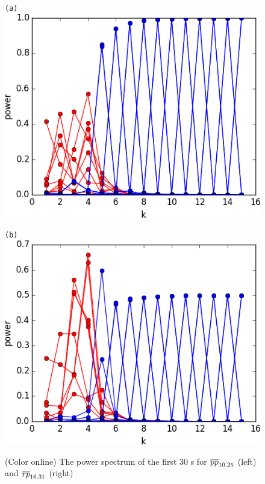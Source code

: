 \documentclass[final,leqno,onefignum,onetabnum]{siamltexmm}
\begin{document}
\begin{figure}[h]
  \centering
  \begin{minipage}{.47\textwidth}
    \centering \small{\texttt{(a)}}
    \includegraphics[width=\textwidth]{ppo1power64}
  \end{minipage}
  \begin{minipage}{.47\textwidth}
    \centering \small{\texttt{(b)}}
    \includegraphics[width=\textwidth]{rpo1power64}
  \end{minipage}
  \caption{(Color online)
    The power spectrum of the first 30 \Fv s for ${\overline{pp}}_{10.25}$
    (left) and ${\overline{rp}}_{16.31}$ (right)
}
\end{figure}
\end{document}
